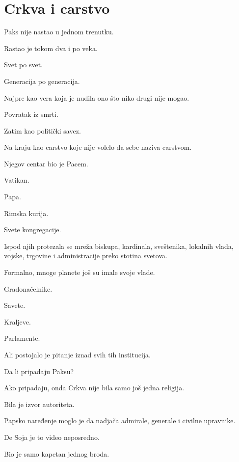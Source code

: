 
\chapter{Crkva i carstvo}


Paks nije nastao u jednom trenutku.

Rastao je tokom dva i po veka.

Svet po svet.

Generacija po generacija.

Najpre kao vera koja je nudila ono što niko drugi nije mogao.

Povratak iz smrti.

Zatim kao politički savez.

Na kraju kao carstvo koje nije volelo da sebe naziva carstvom.

\bigskip

Njegov centar bio je Pacem.

Vatikan.

Papa.

Rimska kurija.

Svete kongregacije.

Ispod njih protezala se mreža biskupa, kardinala, sveštenika, lokalnih vlada, vojske, trgovine i administracije preko stotina svetova.

\bigskip

Formalno, mnoge planete još su imale svoje vlade.

Gradonačelnike.

Savete.

Kraljeve.

Parlamente.

Ali postojalo je pitanje iznad svih tih institucija.

Da li pripadaju Paksu?

\bigskip

Ako pripadaju, onda Crkva nije bila samo još jedna religija.

Bila je izvor autoriteta.

\bigskip

Papsko naređenje moglo je da nadjača admirale, generale i civilne upravnike.

De Soja je to video neposredno.

Bio je samo kapetan jednog broda.

